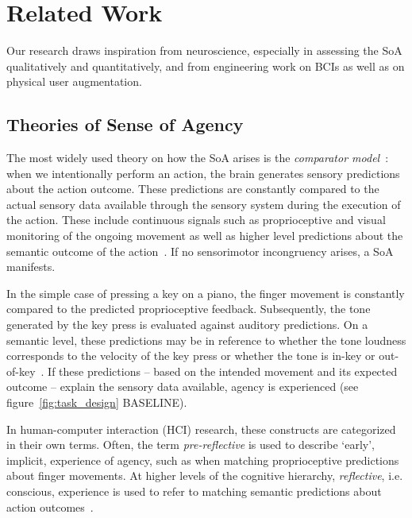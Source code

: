 \section{Related Work}
Our research draws inspiration from neuroscience, especially in assessing the SoA qualitatively and quantitatively, and from engineering work on BCIs as well as on physical user augmentation.

\subsection{Theories of Sense of Agency}
The most widely used theory on how the SoA arises is the \textit{comparator model}~\cite{Blakemore2002-dj, Frith2000-ch, Frith2006-sc}: when we intentionally perform an action, the brain generates sensory predictions about the action outcome. These predictions are constantly compared to the actual sensory data available through the sensory system during the execution of the action. These include continuous signals such as proprioceptive and visual monitoring of the ongoing movement as well as higher level predictions about the semantic outcome of the action~\cite{Clark2013-ah, Haggard2003-ff, Haggard2017-uv}. If no sensorimotor incongruency arises, a SoA manifests. 

In the simple case of pressing a key on a piano, the finger movement is constantly compared to the predicted proprioceptive feedback. Subsequently, the tone generated by the key press is evaluated against auditory predictions. On a semantic level, these predictions may be in reference to whether the tone loudness corresponds to the velocity of the key press or whether the tone is in-key or out-of-key~\cite{Pangratz2023-ew}. If these predictions -- based on the intended movement and its expected outcome -- explain the sensory data available, agency is experienced (see figure~\ref{fig:task_design} BASELINE).

In human-computer interaction (HCI) research, these constructs are categorized in their own terms. Often, the term \textit{pre-reflective} is used to describe `early', implicit, experience of agency, such as when matching proprioceptive predictions about finger movements. At higher levels of the cognitive hierarchy, \textit{reflective}, i.e. conscious, experience is used to refer to matching semantic predictions about action outcomes~\cite{Danry2022-xk, Cornelio2022-aq}. 

